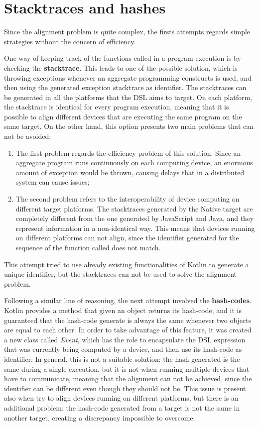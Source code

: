 \section{Stacktraces and hashes}\label{section:stacktraces_hashes}
Since the alignment problem is quite complex, the firsts attempts regards simple strategies without the concern of efficiency.

One way of keeping track of the functions called in a program execution is by checking the \textbf{stacktrace}. This leads to one of the possible solution, which is throwing exceptions whenever an aggregate programming constructs is used, and then using the generated exception stacktrace as identifier.\newline
The stacktraces can be generated in all the platforms that the DSL aims to target. On each platform, the stacktrace is identical for every program execution, meaning that it is possible to align different devices that are executing the same program on the same target.\newline
On the other hand, this option presents two main problems that can not be avoided:
\begin{enumerate}
    \item The first problem regards the efficiency problem of this solution. Since an aggregate program runs continuously on each computing device, an enormous amount of exception would be thrown, causing delays that in a distributed system can cause issues;
    \item The second problem refers to the interoperability of device computing on different target platforms. The stacktraces generated by the Native target are completely different from the one generated by JavaScript and Java, and they represent information in a non-identical way. This means that devices running on different platforms can not align, since the identifier generated for the sequence of the function called does not match.
\end{enumerate}
This attempt tried to use already existing functionalities of Kotlin to generate a unique identifier, but the stacktraces can not be used to solve the alignment problem.

Following a similar line of reasoning, the next attempt involved the \textbf{hash-codes}. Kotlin provides a method that given an object returns its hash-code, and it is guaranteed that the hash-code generate is always the same whenever two objects are equal to each other. In order to take advantage of this feature, it was created a new class called \textit{Event}, which has the role to encapsulate the DSL expression that was currently being computed by a device, and then use its hash-code as identifier. In general, this is not a suitable solution: the hash generated is the same during a single execution, but it is not when running multiple devices that have to communicate, meaning that the alignment can not be achieved, since the identifier can be different even though they should not be.\newline
This issue is present also when try to align devices running on different platforms, but there is an additional problem: the hash-code generated from a target is not the same in another target, creating a discrepancy impossible to overcome.

